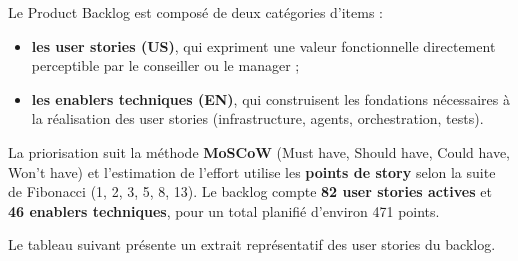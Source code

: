 Le Product Backlog est composé de deux catégories d'items :

\begin{itemize}[label=--]
    \item \textbf{les user stories (US)}, qui expriment une valeur fonctionnelle directement perceptible par le conseiller ou le manager ;
    \item \textbf{les enablers techniques (EN)}, qui construisent les fondations nécessaires à la réalisation des user stories (infrastructure, agents, orchestration, tests).
\end{itemize}

La priorisation suit la méthode \textbf{MoSCoW} (Must have, Should have, Could have, Won't have) et l'estimation de l'effort utilise les \textbf{points de story} selon la suite de Fibonacci (1, 2, 3, 5, 8, 13). Le backlog compte \textbf{82 user stories actives} et \textbf{46 enablers techniques}, pour un total planifié d'environ 471 points.

Le tableau suivant présente un extrait représentatif des user stories du backlog.

